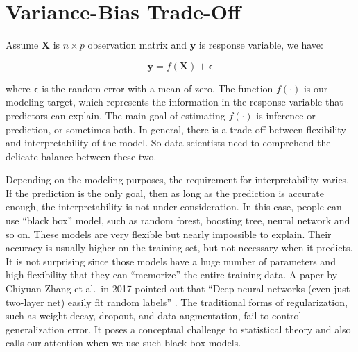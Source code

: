 \documentclass[12pt,]{krantz}
\begin{document}
\hypertarget{vbtradeoff}{%
\section{Variance-Bias Trade-Off}\label{vbtradeoff}}

Assume \(\mathbf{X}\) is \(n \times p\) observation matrix and \(\mathbf{y}\) is response variable, we have:

\begin{equation}
\mathbf{y}=f(\mathbf{X})+\symbf{\epsilon}
\label{eq:generalmodeleq}
\end{equation}

where \(\symbf{\epsilon}\) is the random error with a mean of zero. The function \(f(\cdot)\) is our modeling target, which represents the information in the response variable that predictors can explain. The main goal of estimating \(f(\cdot)\) is inference or prediction, or sometimes both. In general, there is a trade-off between flexibility and interpretability of the model. So data scientists need to comprehend the delicate balance between these two.

Depending on the modeling purposes, the requirement for interpretability varies. If the prediction is the only goal, then as long as the prediction is accurate enough, the interpretability is not under consideration. In this case, people can use ``black box'' model, such as random forest, boosting tree, neural network and so on. These models are very flexible but nearly impossible to explain. Their accuracy is usually higher on the training set, but not necessary when it predicts. It is not surprising since those models have a huge number of parameters and high flexibility that they can ``memorize'' the entire training data. A paper by Chiyuan Zhang et al.~in 2017 pointed out that ``Deep neural networks (even just two-layer net) easily fit random labels'' \citep{rethinkDL}. The traditional forms of regularization, such as weight decay, dropout, and data augmentation, fail to control generalization error. It poses a conceptual challenge to statistical theory and also calls our attention when we use such black-box models.
\end{document}
